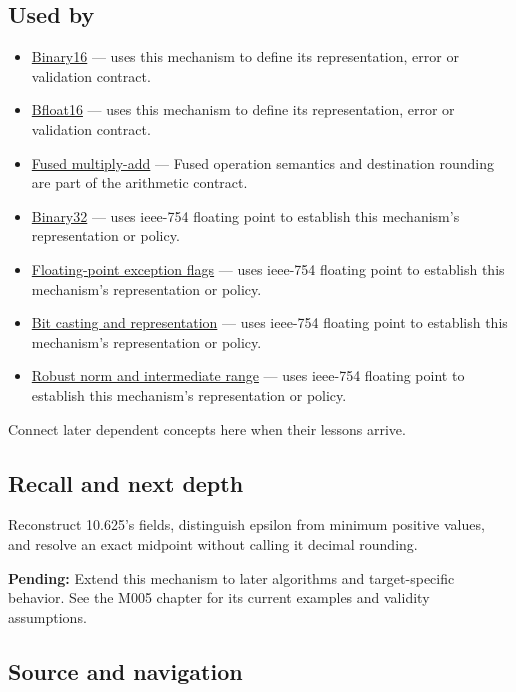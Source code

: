 \subsection{Used by}\label{appendix-343615f49ddf-used-by}

\begin{itemize}
\item
  \hyperref[appendix-34443cec7170]{Binary16} --- uses this mechanism to define its representation, error or validation contract.
\item
  \hyperref[appendix-18b8dd966b5d]{Bfloat16} --- uses this mechanism to define its representation, error or validation contract.
\item
  \hyperref[appendix-41e8ef22a21e]{Fused multiply-add} --- Fused operation semantics and destination rounding are part of the arithmetic contract.
\item
  \hyperref[appendix-5057f9ad327f]{Binary32} --- uses ieee-754 floating point to establish this mechanism's representation or policy.
\item
  \hyperref[appendix-ed8531b46754]{Floating-point exception flags} --- uses ieee-754 floating point to establish this mechanism's representation or policy.
\item
  \hyperref[appendix-34ee45f161c1]{Bit casting and representation} --- uses ieee-754 floating point to establish this mechanism's representation or policy.
\item
  \hyperref[appendix-7f1e17dcafb1]{Robust norm and intermediate range} --- uses ieee-754 floating point to establish this mechanism's representation or policy.
\end{itemize}

Connect later dependent concepts here when their lessons arrive.

\subsection{Recall and next depth}\label{appendix-343615f49ddf-recall-and-next-depth}

Reconstruct 10.625's fields, distinguish epsilon from minimum positive values, and resolve an exact midpoint without calling it decimal rounding.

\textbf{Pending:} Extend this mechanism to later algorithms and target-specific behavior. See the M005 chapter for its current examples and validity assumptions.

\subsection{Source and navigation}\label{appendix-343615f49ddf-source-and-navigation}

